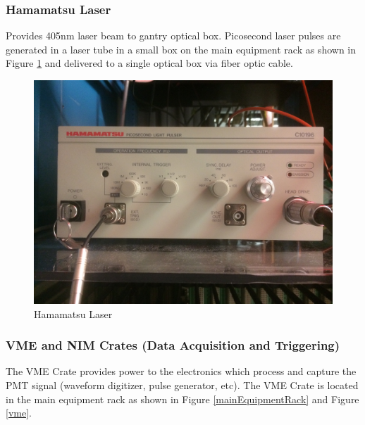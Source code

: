 \documentclass[twoside,letterpaper]{refart}
\begin{document}
\subsubsection{Hamamatsu Laser}

Provides 405nm laser beam to gantry optical box.  Picosecond laser pulses are generated in a laser tube in a small box on the main equipment rack as shown in Figure \ref{laser} and delivered to a single optical box via fiber optic cable. 

\FloatBarrier

\begin{figure}[!htpb] 
	\centering	
	\includegraphics[scale=0.07]{images/laser}
	\caption{Hamamatsu Laser}
	\label{laser}
\end{figure}

\FloatBarrier

\clearpage

\subsubsection{VME and NIM Crates (Data Acquisition and Triggering)}

The VME Crate provides power to the electronics which process and capture the PMT signal (waveform digitizer, pulse generator, etc).  The VME Crate is located in the main equipment rack as shown in Figure \ref{mainEquipmentRack} and Figure \ref{vme}. 

\FloatBarrier
\end{document}
